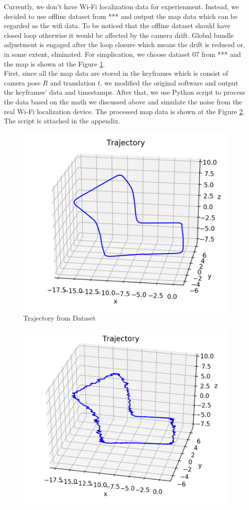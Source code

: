 Currently, we don't have Wi-Fi localization data for experienment. Instead, we decided to use offline dataset from *** and output the map data which can be regarded as the wifi data. To be noticed that the offline dataset should have closed loop otherwise it would be affected by the camera drift. Global bundle adjustment is engaged after the loop closure which means the drift is reduced or, in some extent, elminated. For simplication, we choose dataset 07 from *** and the map is shown at the Figure \ref{Track_original}.\\
First, since all the map data are stored in the keyframes which is consist of camera pose $R$ and translation $t$, we modified the original software and output the keyframes' data and timestamps. After that, we use Python script to process the data based on the math we discussed above and simulate the noise from the real Wi-Fi localization device. The processed map data is shown at the Figure \ref{Track_processed}. The script is attached in the appendix.
\begin{figure}
    \centering
    \includegraphics[scale=0.72]{Trajectory.png}
    \caption{Trajectory from Dataset}
    \label{Track_original}
\end{figure}
\begin{figure}
    \centering
    \includegraphics[scale=0.5]{Trajectory_1.png}
    \caption{}
    \label{Track_processed}
\end{figure}
